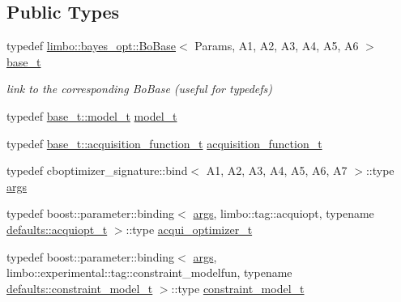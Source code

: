 \subsection*{Public Types}
\begin{DoxyCompactItemize}
\item 
typedef \hyperlink{classlimbo_1_1bayes__opt_1_1_bo_base}{limbo\+::bayes\+\_\+opt\+::\+Bo\+Base}$<$ Params, A1, A2, A3, A4, A5, A6 $>$ \hyperlink{classlimbo_1_1experimental_1_1bayes__opt_1_1_c_b_optimizer_a52bd94f4487175ef317b4d35149ac3c9}{base\+\_\+t}
\begin{DoxyCompactList}\small\item\em link to the corresponding Bo\+Base (useful for typedefs) \end{DoxyCompactList}\item 
typedef \hyperlink{classlimbo_1_1bayes__opt_1_1_bo_base_a151af5c7eef92a82d8813bb2e067d267}{base\+\_\+t\+::model\+\_\+t} \hyperlink{classlimbo_1_1experimental_1_1bayes__opt_1_1_c_b_optimizer_a2809982ff7ad024476d8a7babfec9166}{model\+\_\+t}
\item 
typedef \hyperlink{classlimbo_1_1bayes__opt_1_1_bo_base_a200a43abb6c95d2d99660898b36f2200}{base\+\_\+t\+::acquisition\+\_\+function\+\_\+t} \hyperlink{classlimbo_1_1experimental_1_1bayes__opt_1_1_c_b_optimizer_aa8977e9e98215bb5e727ce2e182099dd}{acquisition\+\_\+function\+\_\+t}
\item 
typedef cboptimizer\+\_\+signature\+::bind$<$ A1, A2, A3, A4, A5, A6, A7 $>$\+::type \hyperlink{classlimbo_1_1experimental_1_1bayes__opt_1_1_c_b_optimizer_a63a9a28cc266539b492774e381d06d6f}{args}
\item 
typedef boost\+::parameter\+::binding$<$ \hyperlink{classlimbo_1_1bayes__opt_1_1_bo_base_a3844c259aa1e59d0241f90390aa6f7fa}{args}, limbo\+::tag\+::acquiopt, typename \hyperlink{structlimbo_1_1experimental_1_1bayes__opt_1_1_c_b_optimizer_1_1defaults_ad87ee1f502b5730ede0b4e46ef9b6437}{defaults\+::acquiopt\+\_\+t} $>$\+::type \hyperlink{classlimbo_1_1experimental_1_1bayes__opt_1_1_c_b_optimizer_afc949eca6b8ea7a84b5e0b38e8c17a4d}{acqui\+\_\+optimizer\+\_\+t}
\item 
typedef boost\+::parameter\+::binding$<$ \hyperlink{classlimbo_1_1bayes__opt_1_1_bo_base_a3844c259aa1e59d0241f90390aa6f7fa}{args}, limbo\+::experimental\+::tag\+::constraint\+\_\+modelfun, typename \hyperlink{structlimbo_1_1experimental_1_1bayes__opt_1_1_c_b_optimizer_1_1defaults_afbbb3a7663e1cabe65b094bca5bebc75}{defaults\+::constraint\+\_\+model\+\_\+t} $>$\+::type \hyperlink{classlimbo_1_1experimental_1_1bayes__opt_1_1_c_b_optimizer_a1f820a8eb0aebd5eb8ff359b35b98bdc}{constraint\+\_\+model\+\_\+t}
\end{DoxyCompactItemize}
